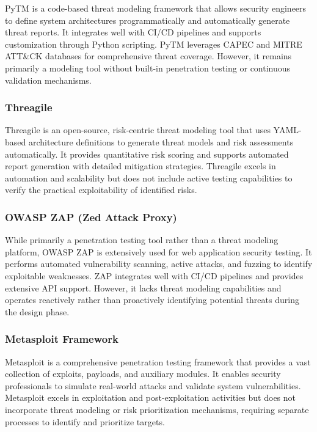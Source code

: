 \documentclass[12pt,a4paper]{report}
\begin{document}
PyTM is a code-based threat modeling framework that allows security engineers to define system architectures programmatically and automatically generate threat reports. It integrates well with CI/CD pipelines and supports customization through Python scripting. PyTM leverages CAPEC and MITRE ATT\&CK databases for comprehensive threat coverage. However, it remains primarily a modeling tool without built-in penetration testing or continuous validation mechanisms.

\subsubsection{Threagile}

Threagile is an open-source, risk-centric threat modeling tool that uses YAML-based architecture definitions to generate threat models and risk assessments automatically. It provides quantitative risk scoring and supports automated report generation with detailed mitigation strategies. Threagile excels in automation and scalability but does not include active testing capabilities to verify the practical exploitability of identified risks.

\subsubsection{OWASP ZAP (Zed Attack Proxy)}

While primarily a penetration testing tool rather than a threat modeling platform, OWASP ZAP is extensively used for web application security testing. It performs automated vulnerability scanning, active attacks, and fuzzing to identify exploitable weaknesses. ZAP integrates well with CI/CD pipelines and provides extensive API support. However, it lacks threat modeling capabilities and operates reactively rather than proactively identifying potential threats during the design phase.

\subsubsection{Metasploit Framework}

Metasploit is a comprehensive penetration testing framework that provides a vast collection of exploits, payloads, and auxiliary modules. It enables security professionals to simulate real-world attacks and validate system vulnerabilities. Metasploit excels in exploitation and post-exploitation activities but does not incorporate threat modeling or risk prioritization mechanisms, requiring separate processes to identify and prioritize targets.
\end{document}

